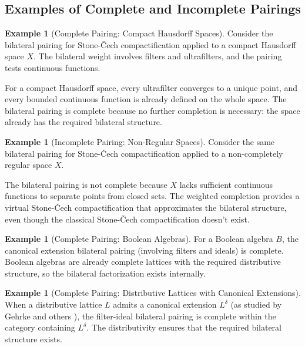 \documentclass[11pt]{article}
\theoremstyle{plain}
\theoremstyle{definition}
\newtheorem{example}[theorem]{Example}
\theoremstyle{remark}
\begin{document}
\subsection{Examples of Complete and Incomplete Pairings}

\begin{example}[Complete Pairing: Compact Hausdorff Spaces]
Consider the bilateral pairing for Stone-\v{C}ech compactification applied to a compact Hausdorff space $X$. The bilateral weight involves filters and ultrafilters, and the pairing tests continuous functions.

For a compact Hausdorff space, every ultrafilter converges to a unique point, and every bounded continuous function is already defined on the whole space. The bilateral pairing is complete because no further completion is necessary: the space already has the required bilateral structure.
\end{example}

\begin{example}[Incomplete Pairing: Non-Regular Spaces]
Consider the same bilateral pairing for Stone-\v{C}ech compactification applied to a non-completely regular space $X$. 

The bilateral pairing is not complete because $X$ lacks sufficient continuous functions to separate points from closed sets. The weighted completion provides a virtual Stone-\v{C}ech compactification that approximates the bilateral structure, even though the classical Stone-\v{C}ech compactification doesn't exist.
\end{example}

\begin{example}[Complete Pairing: Boolean Algebras]
For a Boolean algebra $B$, the canonical extension bilateral pairing (involving filters and ideals) is complete. Boolean algebras are already complete lattices with the required distributive structure, so the bilateral factorization exists internally.
\end{example}

\begin{example}[Complete Pairing: Distributive Lattices with Canonical Extensions]
When a distributive lattice $L$ admits a canonical extension $L^{\delta}$ (as studied by Gehrke and others \cite{gehrke2001bounded}), the filter-ideal bilateral pairing is complete within the category containing $L^{\delta}$. The distributivity ensures that the required bilateral structure exists.
\end{example}
\end{document}
